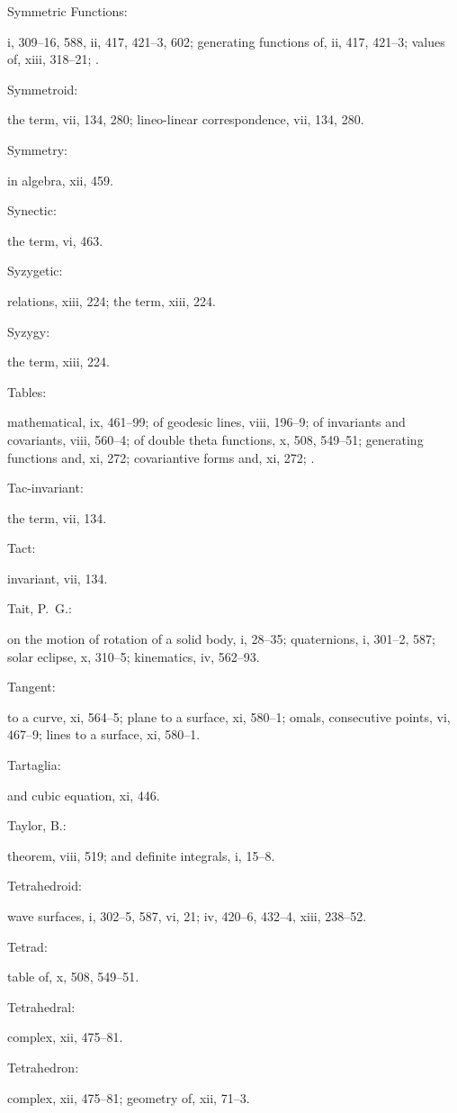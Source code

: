 \documentclass[11pt,a4paper]{book}
\providecommand{\V}[1]{#1}
\providecommand{\IndexEntry}[2]{#1\dotfill #2\par}
\begin{document}
\IndexEntry{Symmetric Functions}: \V{i}, 309--16, 588, \V{ii}, 417, 421--3, 602; generating functions of, \V{ii}, 417, 421--3; values of, \V{xiii}, 318--21; .

\IndexEntry{Symmetroid}: the term, \V{vii}, 134, 280; lineo-linear correspondence, \V{vii}, 134, 280.

\IndexEntry{Symmetry}: in algebra, \V{xii}, 459.

\IndexEntry{Synectic}: the term, \V{vi}, 463.

\IndexEntry{Syzygetic}: relations, \V{xiii}, 224; the term, \V{xiii}, 224.

\IndexEntry{Syzygy}: the term, \V{xiii}, 224.

\IndexEntry{Tables}: mathematical, \V{ix}, 461--99; of geodesic lines, \V{viii}, 196--9; of invariants and covariants, \V{viii}, 560--4; of double theta functions, \V{x}, 508, 549--51; generating functions and, \V{xi}, 272; covariantive forms and, \V{xi}, 272; .

\IndexEntry{Tac-invariant}: the term, \V{vii}, 134.

\IndexEntry{Tact}: invariant, \V{vii}, 134.

\IndexEntry{Tait, P.\ G.}: on the motion of rotation of a solid body, \V{i}, 28--35; quaternions, \V{i}, 301--2, 587; solar eclipse, \V{x}, 310--5; kinematics, \V{iv}, 562--93.

\IndexEntry{Tangent}: to a curve, \V{xi}, 564--5; plane to a surface, \V{xi}, 580--1; omals, consecutive points, \V{vi}, 467--9; lines to a surface, \V{xi}, 580--1.

\IndexEntry{Tartaglia}: and cubic equation, \V{xi}, 446.

\IndexEntry{Taylor, B.}: theorem, \V{viii}, 519; and definite integrals, \V{i}, 15--8.

\IndexEntry{Tetrahedroid}: wave surfaces, \V{i}, 302--5, 587, \V{vi}, 21; \V{iv}, 420--6, 432--4, \V{xiii}, 238--52.

\IndexEntry{Tetrad}: table of, \V{x}, 508, 549--51.

\IndexEntry{Tetrahedral}: complex, \V{xii}, 475--81.

\IndexEntry{Tetrahedron}: complex, \V{xii}, 475--81; geometry of, \V{xii}, 71--3.

\newpage

\setcounter{page}{127}
\end{document}
